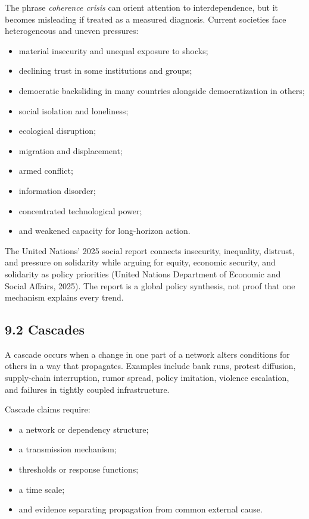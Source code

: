 \documentclass[
  11pt,
]{article}
\providecommand{\tightlist}{%
  \setlength{\itemsep}{0pt}\setlength{\parskip}{0pt}}
\begin{document}
The phrase \emph{coherence crisis} can orient attention to
interdependence, but it becomes misleading if treated as a measured
diagnosis. Current societies face heterogeneous and uneven pressures:

\begin{itemize}
\tightlist
\item
  material insecurity and unequal exposure to shocks;
\item
  declining trust in some institutions and groups;
\item
  democratic backsliding in many countries alongside democratization in
  others;
\item
  social isolation and loneliness;
\item
  ecological disruption;
\item
  migration and displacement;
\item
  armed conflict;
\item
  information disorder;
\item
  concentrated technological power;
\item
  and weakened capacity for long-horizon action.
\end{itemize}

The United Nations' 2025 social report connects insecurity, inequality,
distrust, and pressure on solidarity while arguing for equity, economic
security, and solidarity as policy priorities (United Nations Department
of Economic and Social Affairs, 2025). The report is a global policy
synthesis, not proof that one mechanism explains every trend.

\subsection{9.2 Cascades}\label{cascades}

A cascade occurs when a change in one part of a network alters
conditions for others in a way that propagates. Examples include bank
runs, protest diffusion, supply-chain interruption, rumor spread, policy
imitation, violence escalation, and failures in tightly coupled
infrastructure.

Cascade claims require:

\begin{itemize}
\tightlist
\item
  a network or dependency structure;
\item
  a transmission mechanism;
\item
  thresholds or response functions;
\item
  a time scale;
\item
  and evidence separating propagation from common external cause.
\end{itemize}
\end{document}
